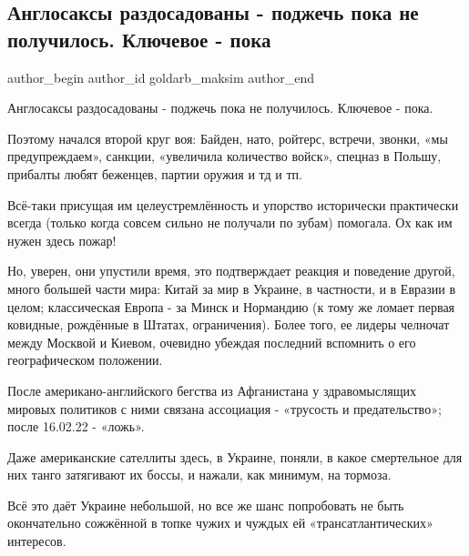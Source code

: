  
 
 
 
 
 
\subsection{Англосаксы раздосадованы - поджечь пока не получилось. Ключевое - пока}
\label{sec:17_02_2022.fb.goldarb_maksim.1.anglosaksy}
 
\ifcmt
 author_begin
   author_id goldarb_maksim
 author_end
\fi

Англосаксы раздосадованы - поджечь пока не получилось. Ключевое - пока.

Поэтому начался второй круг воя: Байден, нато, ройтерс, встречи, звонки, «мы
предупреждаем», санкции, «увеличила количество войск», спецназ в Польшу,
прибалты любят беженцев, партии оружия и тд и тп. 

Всё-таки присущая им целеустремлённость и упорство исторически практически
всегда (только когда совсем сильно не получали по зубам) помогала. Ох как им
нужен здесь пожар! 

Но, уверен, они упустили время, это подтверждает реакция и поведение другой,
много большей части мира: Китай за мир в Украине, в частности, и в Евразии в
целом; классическая Европа - за Минск и Нормандию (к тому же ломает первая
ковидные, рождённые в Штатах, ограничения). Более того, ее лидеры челночат
между Москвой и Киевом, очевидно убеждая последний вспомнить о его
географическом положении. 

После американо-английского бегства из Афганистана у здравомыслящих мировых
политиков с ними связана ассоциация - «трусость и предательство»; после
16.02.22 - «ложь».

Даже американские сателлиты здесь, в Украине, поняли, в какое смертельное для
них танго затягивают их боссы, и нажали, как минимум, на тормоза. 

Всё это даёт Украине небольшой, но все же шанс попробовать не быть окончательно
сожжённой в топке чужих и чуждых ей «трансатлантических» интересов.

